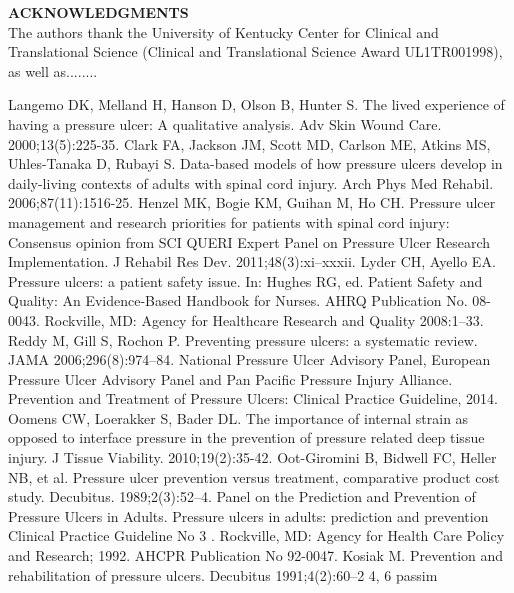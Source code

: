 \documentclass{amia}
\begin{document}
\textbf{ACKNOWLEDGMENTS}\\
The authors thank the University of Kentucky Center for Clinical and Translational Science (Clinical and Translational Science Award UL1TR001998), as well as........

\makeatletter
\renewcommand{\@biblabel}[1]{\hfill #1.}
\makeatother



{\footnotesize

\begin{thebibliography}{1}
\setlength\itemsep{-0.1em}

Langemo DK, Melland H, Hanson D, Olson B, Hunter S. The lived experience of having a pressure ulcer: A qualitative analysis. Adv Skin Wound Care. 2000;13(5):225-35.
Clark FA, Jackson JM, Scott MD, Carlson ME, Atkins MS, Uhles-Tanaka D, Rubayi S. Data-based models of how pressure ulcers develop in daily-living contexts of adults with spinal cord injury. Arch Phys Med Rehabil. 2006;87(11):1516-25.
Henzel MK, Bogie KM, Guihan M, Ho CH. Pressure ulcer management and research priorities for patients with spinal cord injury: Consensus opinion from SCI QUERI Expert Panel on Pressure Ulcer Research Implementation. J Rehabil Res Dev. 2011;48(3):xi–xxxii.
Lyder CH, Ayello EA. Pressure ulcers: a patient safety issue. In: Hughes RG, ed. Patient Safety and Quality: An Evidence-Based Handbook for Nurses. AHRQ Publication No. 08-0043. Rockville, MD: Agency for Healthcare Research and Quality 2008:1–33.
Reddy M, Gill S, Rochon P. Preventing pressure ulcers: a systematic review. JAMA 2006;296(8):974–84.
National Pressure Ulcer Advisory Panel, European Pressure Ulcer Advisory Panel and Pan Pacific Pressure Injury Alliance. Prevention and Treatment of Pressure Ulcers: Clinical Practice Guideline, 2014.
Oomens CW, Loerakker S, Bader DL. The importance of internal strain as opposed to interface pressure in the prevention of pressure related deep tissue injury. J Tissue Viability. 2010;19(2):35-42.
Oot-Giromini B, Bidwell FC, Heller NB, et al. Pressure ulcer prevention versus treatment, comparative product cost study. Decubitus. 1989;2(3):52–4.
Panel on the Prediction and Prevention of Pressure Ulcers in Adults. Pressure ulcers in adults: prediction and prevention Clinical Practice Guideline No 3 . Rockville, MD: Agency for Health Care Policy and Research; 1992. AHCPR Publication No 92-0047.
Kosiak M. Prevention and rehabilitation of pressure ulcers. Decubitus 1991;4(2):60–2 4, 6 passim

\end{thebibliography}}
\end{document}
